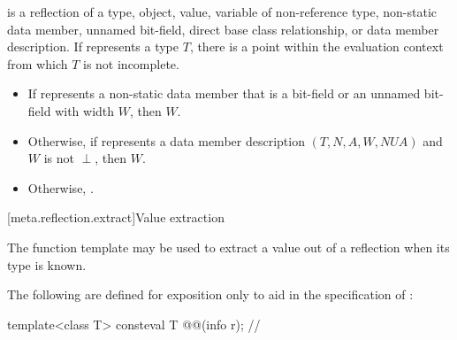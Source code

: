 \begin{itemdescr}
\pnum
\constantwhen
{} is a reflection of a
type,
object,
value,
variable of non-reference type,
non-static data member,
unnamed bit-field,
direct base class relationship, or
data member description.
If  represents a type $T$,
there is a point within the evaluation context from which $T$ is not incomplete.

\pnum
\returns
\begin{itemize}
\item
  If  represents a non-static data member
  that is a bit-field
  or an unnamed bit-field with width $W$,
  then $W$.
\item
  Otherwise, if  represents a data member description
  $(T, N, A, W, \mathit{NUA})$
  and $W$ is not $\perp$,
  then $W$.
\item
  Otherwise, .
\end{itemize}
\end{itemdescr}

[meta.reflection.extract]{Value extraction}

\pnum
The  function template may be used
to extract a value out of a reflection when its type is known.

\pnum
The following are defined for exposition only
to aid in the specification of :

\begin{itemdecl}
template<class T>
  consteval T @@(info r);      // \expos
\end{itemdecl}

